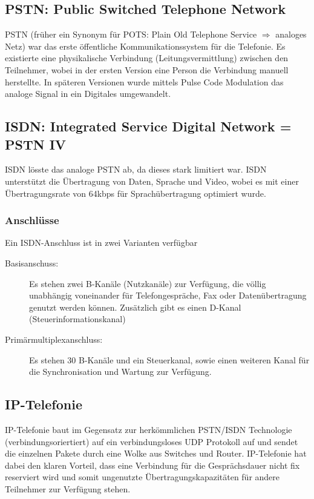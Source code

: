 \subsection{PSTN: Public Switched Telephone Network}
PSTN (früher ein Synonym für POTS: Plain Old Telephone Service $\Rightarrow$ analoges Netz) war das erste öffentliche Kommunikationssystem für die Telefonie. Es existierte eine physikalische Verbindung (Leitungsvermittlung) zwischen den Teilnehmer, wobei in der ersten Version eine Person die Verbindung manuell herstellte. In späteren Versionen wurde mittels Pulse Code Modulation das analoge Signal in ein Digitales umgewandelt.

\subsection{ISDN: Integrated Service Digital Network = PSTN IV}
ISDN lösste das analoge PSTN ab, da dieses stark limitiert war. ISDN unterstützt die Übertragung von Daten, Sprache und Video, wobei es mit einer Übertragungsrate von 64kbps für Sprachübertragung optimiert wurde. 

\subsubsection{Anschlüsse}
Ein ISDN-Anschluss ist in zwei Varianten verfügbar
\begin{description}
	\item[Basisanschuss:] Es stehen zwei B-Kanäle (Nutzkanäle) zur Verfügung, die völlig unabhängig voneinander für Telefongespräche, Fax oder Datenübertragung genutzt werden können. Zusätzlich gibt es einen D-Kanal (Steuerinformationskanal)
	\item[Primärmultiplexanschluss:] Es stehen 30 B-Kanäle und ein Steuerkanal, sowie einen weiteren Kanal für die Synchronisation und Wartung zur Verfügung.
\end{description}

\subsection{IP-Telefonie}
IP-Telefonie baut im Gegensatz zur herkömmlichen PSTN/ISDN Technologie (verbindungsoriertiert) auf ein verbindungsloses UDP Protokoll auf und sendet die einzelnen Pakete durch eine Wolke aus Switches und Router. IP-Telefonie hat dabei den klaren Vorteil, dass eine Verbindung für die Gesprächsdauer nicht fix reserviert wird und somit ungenutzte Übertragungskapazitäten für andere Teilnehmer zur Verfügung stehen.

